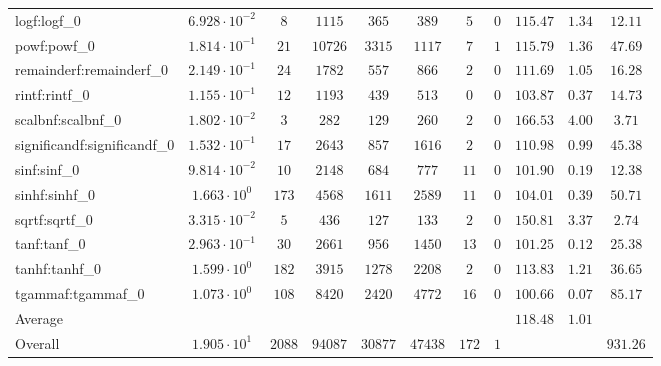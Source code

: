 \begin{tabular}{|l|c|c|c|c|c|c|c|c|c|c|}
logf:logf\_0                 & $ 6.928 \cdot 10^{-2} $ & $ 8      $ & $ 1115  $ & $ 365   $ & $ 389   $ & $ 5   $ & $ 0 $ & $ 115.47      $ & $ 1.34    $ & $ 12.11   $ \\
powf:powf\_0                 & $ 1.814 \cdot 10^{-1} $ & $ 21     $ & $ 10726 $ & $ 3315  $ & $ 1117  $ & $ 7   $ & $ 1 $ & $ 115.79      $ & $ 1.36    $ & $ 47.69   $ \\
remainderf:remainderf\_0     & $ 2.149 \cdot 10^{-1} $ & $ 24     $ & $ 1782  $ & $ 557   $ & $ 866   $ & $ 2   $ & $ 0 $ & $ 111.69      $ & $ 1.05    $ & $ 16.28   $ \\
rintf:rintf\_0               & $ 1.155 \cdot 10^{-1} $ & $ 12     $ & $ 1193  $ & $ 439   $ & $ 513   $ & $ 0   $ & $ 0 $ & $ 103.87      $ & $ 0.37    $ & $ 14.73   $ \\
scalbnf:scalbnf\_0           & $ 1.802 \cdot 10^{-2} $ & $ 3      $ & $ 282   $ & $ 129   $ & $ 260   $ & $ 2   $ & $ 0 $ & $ 166.53      $ & $ 4.00    $ & $ 3.71    $ \\
significandf:significandf\_0 & $ 1.532 \cdot 10^{-1} $ & $ 17     $ & $ 2643  $ & $ 857   $ & $ 1616  $ & $ 2   $ & $ 0 $ & $ 110.98      $ & $ 0.99    $ & $ 45.38   $ \\
sinf:sinf\_0                 & $ 9.814 \cdot 10^{-2} $ & $ 10     $ & $ 2148  $ & $ 684   $ & $ 777   $ & $ 11  $ & $ 0 $ & $ 101.90      $ & $ 0.19    $ & $ 12.38   $ \\
sinhf:sinhf\_0               & $ 1.663 \cdot 10^{0}  $ & $ 173    $ & $ 4568  $ & $ 1611  $ & $ 2589  $ & $ 11  $ & $ 0 $ & $ 104.01      $ & $ 0.39    $ & $ 50.71   $ \\
sqrtf:sqrtf\_0               & $ 3.315 \cdot 10^{-2} $ & $ 5      $ & $ 436   $ & $ 127   $ & $ 133   $ & $ 2   $ & $ 0 $ & $ 150.81      $ & $ 3.37    $ & $ 2.74    $ \\
tanf:tanf\_0                 & $ 2.963 \cdot 10^{-1} $ & $ 30     $ & $ 2661  $ & $ 956   $ & $ 1450  $ & $ 13  $ & $ 0 $ & $ 101.25      $ & $ 0.12    $ & $ 25.38   $ \\
tanhf:tanhf\_0               & $ 1.599 \cdot 10^{0}  $ & $ 182    $ & $ 3915  $ & $ 1278  $ & $ 2208  $ & $ 2   $ & $ 0 $ & $ 113.83      $ & $ 1.21    $ & $ 36.65   $ \\
tgammaf:tgammaf\_0           & $ 1.073 \cdot 10^{0}  $ & $ 108    $ & $ 8420  $ & $ 2420  $ & $ 4772  $ & $ 16  $ & $ 0 $ & $ 100.66      $ & $ 0.07    $ & $ 85.17   $ \\
\hline
Average                      & $                     $ & $        $ & $       $ & $       $ & $       $ & $     $ & $   $ & $ 118.48      $ & $ 1.01    $ & $         $ \\
\hline
Overall                      & $ 1.905 \cdot 10^{1}  $ & $ 2088   $ & $ 94087 $ & $ 30877 $ & $ 47438 $ & $ 172 $ & $ 1 $ & $             $ & $         $ & $ 931.26  $ \\
\hline
\end{tabular}
